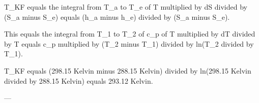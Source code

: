 T_KF equals the integral from T_a to T_e of T multiplied by dS divided by (S_a minus S_e) equals (h_a minus h_e) divided by (S_a minus S_e).  

This equals the integral from T_1 to T_2 of c_p of T multiplied by dT divided by T equals c_p multiplied by (T_2 minus T_1) divided by ln(T_2 divided by T_1).  

T_KF equals (298.15 Kelvin minus 288.15 Kelvin) divided by ln(298.15 Kelvin divided by 288.15 Kelvin) equals 293.12 Kelvin.  

---